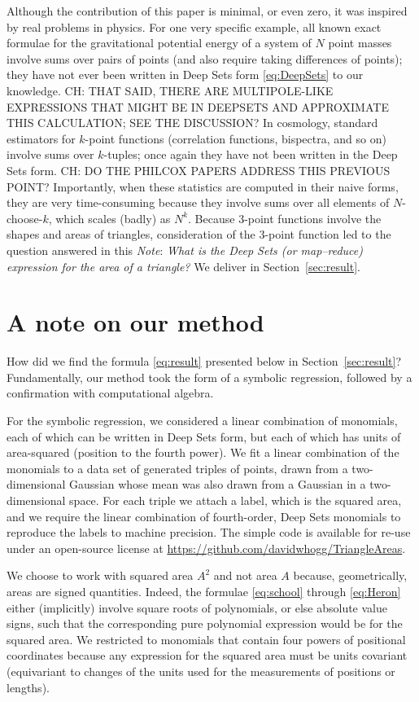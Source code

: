 \documentclass[12pt]{article}
\newcommand{\documentname}{\textsl{Note}}
\newcommand{\sectionname}{Section}
\newcommand{\secref}[1]{\sectionname~\ref{#1}}
\begin{document}
Although the contribution of this paper is minimal, or even zero, it was inspired by real problems in physics.
For one very specific example, all known exact formulae for the gravitational potential energy of a system of $N$ point masses involve sums over pairs of points (and also require taking differences of points); they have not ever been written in Deep Sets form \eqref{eq:DeepSets} to our knowledge.
CH: THAT SAID, THERE ARE MULTIPOLE-LIKE EXPRESSIONS THAT MIGHT BE IN DEEPSETS AND APPROXIMATE THIS CALCULATION; SEE THE DISCUSSION?
In cosmology, standard estimators for $k$-point functions (correlation functions, bispectra, and so on) involve sums over $k$-tuples; once again they have not been written in the Deep Sets form.
CH: DO THE PHILCOX PAPERS ADDRESS THIS PREVIOUS POINT?
Importantly, when these statistics are computed in their naive forms, they are very time-consuming because they involve sums over all elements of $N$-choose-$k$, which scales (badly) as $N^k$.
Because 3-point functions involve the shapes and areas of triangles, consideration of the 3-point function led to the question answered in this \documentname:
\emph{What is the Deep Sets (or map--reduce) expression for the area of a triangle?}
We deliver in \secref{sec:result}.

\section{A note on our method}\label{sec:method}
How did we find the formula \eqref{eq:result} presented below in \secref{sec:result}?
Fundamentally, our method took the form of a symbolic regression, followed by a confirmation with computational algebra.

For the symbolic regression, we considered a linear combination of monomials, each of which can be written in Deep Sets form, but each of which has units of area-squared (position to the fourth power).
We fit a linear combination of the monomials to a data set of generated triples of points, drawn from a two-dimensional Gaussian whose mean was also drawn from a Gaussian in a two-dimensional space.
For each triple we attach a label, which is the squared area, and we require the linear combination of fourth-order, Deep Sets monomials to reproduce the labels to machine precision.
The simple code is available for re-use under an open-source license at \url{https://github.com/davidwhogg/TriangleAreas}.

We choose to work with squared area $A^2$ and not area $A$ because, geometrically, areas are signed quantities.
Indeed, the formulae \eqref{eq:school} through \eqref{eq:Heron} either (implicitly) involve square roots of polynomials, or else absolute value signs, such that the corresponding pure polynomial expression would be for the squared area.
We restricted to monomials that contain four powers of positional coordinates because any expression for the squared area must be units covariant (equivariant to changes of the units used for the measurements of positions or lengths).
\end{document}

